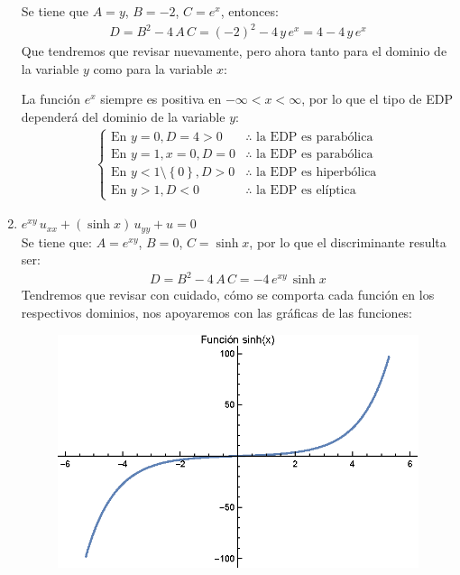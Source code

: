 \begin{enumerate}[label=\alph*)]
Se tiene que $A = y$, $B = -2$, $C =e^{x}$, entonces:
\begin{align*}
D = B^{2} - 4 \, A \, C = (-2)^{2} - 4 \, y \, e^{x} = 4 - 4 \, y \, e^{x}
\end{align*}
Que tendremos que revisar nuevamente, pero ahora tanto para el dominio de la variable $y$ como para la variable $x$:
\par
La función $e^{x}$ siempre es positiva en $-\infty < x < \infty$, por lo que el tipo de EDP dependerá del dominio de la variable $y$:
\begin{align*}
\begin{cases}
\mbox{En } y = 0, D = 4 > 0 & \therefore \mbox{ la EDP es parabólica} \\
\mbox{En } y = 1, x = 0, D = 0 & \therefore \mbox{ la EDP es parabólica} \\
\mbox{En } y < 1 \setminus \left\{ 0 \right\}, D > 0 & \therefore \mbox{ la EDP es hiperbólica} \\
\mbox{En } y > 1, D < 0 & \therefore \mbox{ la EDP es elíptica} \end{cases}
\end{align*}
\item {\Large{$e^{x y} \, u_{xx} + (\sinh x) \, u_{yy} + u = 0$}}
\\
Se tiene que: $A = e^{x y}$, $B = 0$, $C = \sinh x$, por lo que el discriminante resulta ser:
\begin{align*}
D = B^{2} - 4 \, A \, C = - 4 \, e^{x y} \, \sinh x
\end{align*}
Tendremos que revisar con cuidado, cómo se comporta cada función en los respectivos dominios, nos apoyaremos con las gráficas de las funciones:
\begin{figure}[H]
    \centering
    \includegraphics[scale=1]{Imagenes/Ejercicio_Plot_01.eps}

\end{figure}
\end{enumerate}
